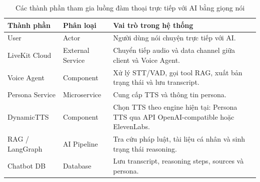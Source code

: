 
\begin{table}[H]
\centering
\renewcommand{\arraystretch}{1.3}

\begin{tabular}{|l|l|p{5cm}|}
\hline
\textbf{Thành phần} & \textbf{Phân loại} & \textbf{Vai trò trong hệ thống} \\ \hline
User & Actor & Người dùng nói chuyện trực tiếp với AI. \\ \hline
LiveKit Cloud & External Service & Chuyển tiếp audio và data channel giữa client và Voice Agent. \\ \hline
Voice Agent & Component & Xử lý STT/VAD, gọi tool RAG, xuất bản trạng thái và lưu transcript. \\ \hline
Persona Service & Microservice & Cung cấp TTS và thông tin persona. \\ \hline
DynamicTTS & Component & Chọn TTS theo engine hiện tại: Persona TTS qua API OpenAI-compatible hoặc ElevenLabs. \\ \hline
RAG / LangGraph & AI Pipeline & Tra cứu pháp luật, tài liệu cá nhân và sinh trạng thái reasoning. \\ \hline
Chatbot DB & Database & Lưu transcript, reasoning steps, sources và persona. \\ \hline
\end{tabular}
\caption{Các thành phần tham gia luồng đàm thoại trực tiếp với AI bằng giọng nói}
\end{table}
